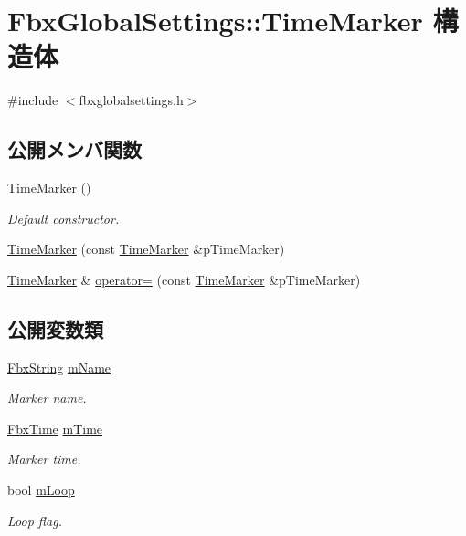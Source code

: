 \hypertarget{struct_fbx_global_settings_1_1_time_marker}{}\section{Fbx\+Global\+Settings\+:\+:Time\+Marker 構造体}
\label{struct_fbx_global_settings_1_1_time_marker}


{\ttfamily \#include $<$fbxglobalsettings.\+h$>$}

\subsection*{公開メンバ関数}
\begin{DoxyCompactItemize}
\item 
\hyperlink{struct_fbx_global_settings_1_1_time_marker_a6d04ed8237bfea2a942a9d25195c08f8}{Time\+Marker} ()
\begin{DoxyCompactList}\small\item\em Default constructor. \end{DoxyCompactList}\item 
\hyperlink{struct_fbx_global_settings_1_1_time_marker_a6fc55ef604d2093fc58471963e7dba8d}{Time\+Marker} (const \hyperlink{struct_fbx_global_settings_1_1_time_marker}{Time\+Marker} \&p\+Time\+Marker)
\item 
\hyperlink{struct_fbx_global_settings_1_1_time_marker}{Time\+Marker} \& \hyperlink{struct_fbx_global_settings_1_1_time_marker_a9c13f5762aece4d2aa93d4cc5c3f7b7a}{operator=} (const \hyperlink{struct_fbx_global_settings_1_1_time_marker}{Time\+Marker} \&p\+Time\+Marker)
\end{DoxyCompactItemize}
\subsection*{公開変数類}
\begin{DoxyCompactItemize}
\item 
\hyperlink{class_fbx_string}{Fbx\+String} \hyperlink{struct_fbx_global_settings_1_1_time_marker_a625789fde7114541d6620bb21e5a3b23}{m\+Name}
\begin{DoxyCompactList}\small\item\em Marker name. \end{DoxyCompactList}\item 
\hyperlink{class_fbx_time}{Fbx\+Time} \hyperlink{struct_fbx_global_settings_1_1_time_marker_abd5a09781e525fb49ba07310d03f1d9a}{m\+Time}
\begin{DoxyCompactList}\small\item\em Marker time. \end{DoxyCompactList}\item 
bool \hyperlink{struct_fbx_global_settings_1_1_time_marker_af9f10266f6d65a9bf7ca315107407b20}{m\+Loop}
\begin{DoxyCompactList}\small\item\em Loop flag. \end{DoxyCompactList}\end{DoxyCompactItemize}


